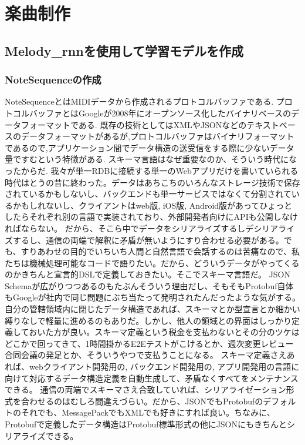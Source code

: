 \chapter{楽曲制作}
\section{Melody\_rnnを使用して学習モデルを作成}
\subsection{NoteSequenceの作成}
NoteSequenceとはMIDIデータから作成されるプロトコルバッファである.
プロトコルバッファとはGoogleが2008年にオープンソース化したバイナリベースのデータフォーマットである.
既存の技術としてはXMLやJSONなどのテキストベースのデータフォーマットがあるが,プロトコルバッファはバイナリフォーマットであるので,アプリケーション間でデータ構造の送受信をする際に少ないデータ量ですむという特徴がある.
スキーマ言語はなぜ重要なのか、そういう時代になったからだ.
我々が単一RDBに接続する単一のWebアプリだけを書いていられる時代はとうの昔に終わった。データはあちこちのいろんなストレージ技術で保存されているかもしないし、バックエンドも単一サービスではなくて分割されているかもしれないし、クライアントはweb版, iOS版, Android版があってひょっとしたらそれぞれ別の言語で実装されており、外部開発者向けにAPIも公開しなければならない。
だから、そこら中でデータをシリアライズするしデシリアライズするし、通信の両端で解釈に矛盾が無いようにすり合わせる必要がある。でも、すりあわせの目的でいちいち人間と自然言語で会話するのは苦痛なので、私たちは機械処理可能なコードで語りたい。だから、どういうデータがやってくるのかきちんと宣言的DSLで定義しておきたい。そこでスキーマ言語だ。
JSON Schemaが広がりつつあるのもたぶんそういう理由だし、そもそもProtobuf自体もGoogleが社内で同じ問題にぶち当たって発明されたんだったような気がする。
自分の管轄領域内に閉じたデータ構造であれば、スキーマとか型宣言とか細かい縛りなしで軽量に進めるのもありだ。しかし、他人の領域との界面はしっかり定義しておいた方が良い。スキーマ定義という税金を支払わないとその分のツケはどこかで回ってきて、1時間掛かるE2Eテストがこけるとか、週次変更レビュー合同会議の発足とか、そういうやつで支払うことになる。
スキーマ定義さえあれば、webクライアント開発用の, バックエンド開発用の, アプリ開発用の言語に向けて対応するデータ構造定義を自動生成して、矛盾なくすべてをメンテナンスできる。
通信の両端でスキーマさえ合致していれば、シリアライゼーション形式を合わせるのはむしろ間違えづらい。だから、JSONでもProtobufのデフォルトのそれでも、MessagePackでもXMLでも好きにすれば良い。ちなみに、Protobufで定義したデータ構造はProtobuf標準形式の他にJSONにもきちんとシリアライズできる。
